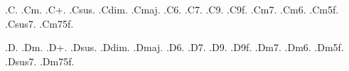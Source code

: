 \def\chXFlatTwoParams#1#2#3{\chBase{#1\lower-1.1ex\hbox{\chFlat}\kern-0.3em\hbox{\chFontRm #2}\lower-1ex\hbox{\chFontIdx #3}}}
\def\chXFlatmSeven#1{\chXFlatTwoParams{#1}{m}{7}}
\def\chXFlatmSix#1{\chXFlatTwoParams{#1}{m}{6}}
\def\chXFlatmFiveFlat#1{\chXFlatTwoParams{#1}{m}{5\chFlat}}
\def\chXFlatSusSeven#1{\chXFlatTwoParams{#1}{sus}{7}}

\def\chXFlatmSevenFiveFlat#1{\chBase{#1\lower-1.1ex\hbox{\chFlat}\kern-0.3em{\chFontRm m\lower0.5ex\vbox{\baselineskip=1ex\hbox{\chFontIdx 7}\hbox{\chFontIdx 5\chFlat}}}}}

%
%
\def\chXSharp#1{\chXOneParamUpper{#1}{\chSharp}}

\def\chXSharpOneParam#1#2{\chBase{#1\lower-1.4ex\hbox{\chSharp}\kern-0.3em\hbox{\chFontRm #2}}}
\def\chXSharpm#1{\chXSharpOneParam{#1}{m}}
\def\chXSharpPlus#1{\chXSharpOneParam{#1}{+}}
\def\chXSharpSus#1{\chXSharpOneParam{#1}{sus}}
\def\chXSharpDim#1{\chXSharpOneParam{#1}{\chDim}}
\def\chXSharpMaj#1{\chXSharpOneParam{#1}{\chMaj}}


\def\chXSharpOneParamUpper#1#2{\chXOneParamUpper{#1}{\chFontIdx\chSharp\kern 0.2ex#2}}
\def\chXSharpSix#1{\chXSharpOneParamUpper{#1}{6}}
\def\chXSharpSeven#1{\chXSharpOneParamUpper{#1}{7}}
\def\chXSharpNine#1{\chXSharpOneParamUpper{#1}{9}}
\def\chXSharpNineFlat#1{\chXSharpOneParamUpper{#1}{9\chFlat}}

\def\chXSharpTwoParams#1#2#3{\chBase{#1\lower-1.4ex\hbox{\chSharp}\kern-0.3em\hbox{\chFontRm #2}\lower-1ex\hbox{\chFontIdx #3}}}
\def\chXSharpmSeven#1{\chXSharpTwoParams{#1}{m}{7}}
\def\chXSharpmSix#1{\chXSharpTwoParams{#1}{m}{6}}
\def\chXSharpmFiveFlat#1{\chXSharpTwoParams{#1}{m}{5\chFlat}}
\def\chXSharpSusSeven#1{\chXSharpTwoParams{#1}{sus}{7}}

\def\chXSharpmSevenFiveFlat#1{\chBase{#1\lower-1.4ex\hbox{\chSharp}\kern-0.3em{\chFontRm m\lower0.5ex\vbox{\baselineskip=1ex\hbox{\chFontIdx 7}\hbox{\chFontIdx 5\chFlat}}}}}

%
%
.C.{}
.Cm.{}
.C+.{}
.Csus.{}
.Cdim.{}
.Cmaj.{}
.C6.{}
.C7.{}
.C9.{}
.C9f.{}
.Cm7.{}
.Cm6.{}
.Cm5f.{}
.Csus7.{}
.Cm75f.{}

%
%
.D.{}
.Dm.{}
.D+.{}
.Dsus.{}
.Ddim.{}
.Dmaj.{}
.D6.{}
.D7.{}
.D9.{}
.D9f.{}
.Dm7.{}
.Dm6.{}
.Dm5f.{}
.Dsus7.{}
.Dm75f.{}

